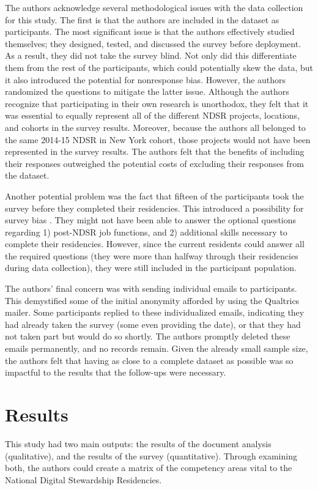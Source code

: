 \documentclass{acm_proc_article-sp}
\begin{document}
The authors acknowledge several methodological issues with the data collection for this study. The first is that the authors are included in the dataset as participants. The most significant issue is that the authors effectively studied themselves; they designed, tested, and discussed the survey before deployment. As a result, they did not take the survey blind. Not only did this differentiate them from the rest of the participants, which could potentially skew the data, but it also introduced the potential for nonresponse bias\cite{31}. However, the authors randomized the questions to mitigate the latter issue. Although the authors recognize that participating in their own research is unorthodox, they felt that it was essential to equally represent all of the different NDSR projects, locations, and cohorts in the survey results. Moreover, because the authors all belonged to the same 2014-15 NDSR in New York cohort, those projects would not have been represented in the survey results. The authors felt that the benefits of including their responses  outweighed the potential costs of excluding their responses from the dataset. 

Another potential problem was the fact that fifteen of the participants took the survey before they completed their residencies. This introduced a possibility for survey bias \cite{33}. They might not have been able to answer the optional questions regarding 1) post-NDSR job functions, and 2) additional skills necessary to complete their residencies. However, since the current residents could answer all the required questions (they were more than halfway through their residencies during data collection), they were still included in the participant population. 

The authors' final concern was with sending individual emails to participants. This demystified some of the initial anonymity afforded by using the Qualtrics mailer. Some participants replied to these individualized emails, indicating they had already taken the survey (some even providing the date), or that they had not taken part but would do so shortly. The authors promptly deleted these emails permanently, and no records remain. Given the already small sample size, the authors felt that having as close to a complete dataset as possible was so impactful to the results that the follow-ups were necessary. 

\section{Results}
This study had two main outputs: the results of the document analysis (qualitative), and the results of the survey (quantitative). Through examining both, the authors could create a matrix of the competency areas vital to the National Digital Stewardship Residencies.  
\end{document}
